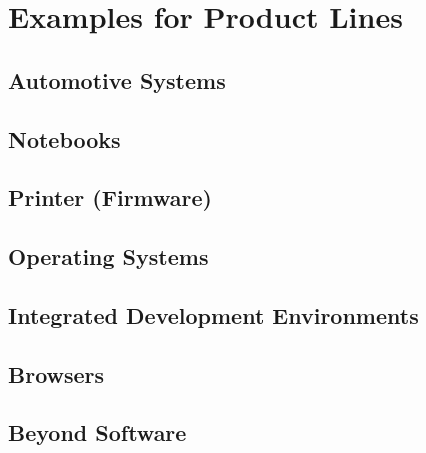 

\subtitle{1. Introduction}
\author{Thomas Thüm}





\section{Examples for Product Lines}

\subsection{Automotive Systems}
\subsection{Notebooks}
\subsection{Printer (Firmware)}
\subsection{Operating Systems}
\subsection{Integrated Development Environments}
\subsection{Browsers}
\subsection{Beyond Software}




